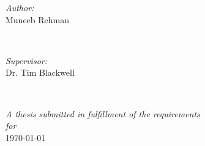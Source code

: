 \begin{titlepage}
\begin{minipage}{0.4\textwidth}
\begin{flushleft} \large
\emph{Author:}\\
Muneeb Rehman 



\end{flushleft}
\end{minipage}
~
\begin{minipage}{0.4\textwidth}
\begin{flushright} \large
\emph{Supervisor:} \\
Dr. Tim Blackwell
\end{flushright}
\end{minipage}\\[2cm]
\makeatother




\vfill

\large \textit{A thesis submitted in fulfillment of the requirements\\ for \degreename}\\[0.3cm] %

\vfill
{\large \today}\\[2cm] %



\end{titlepage}
\cleardoublepage